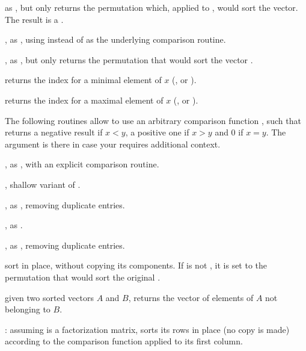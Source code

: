 
 as , but only returns the permutation
which, applied to , would sort the vector. The result is a
.

, as , using 
instead of  as the underlying comparison routine.

, as , but only
returns the permutation that would sort the vector .

 returns the index for a minimal element of $x$
(,  or ).

 returns the index for a maximal element of $x$
(,  or ).

 The following routines allow to use an
arbitrary comparison function ,
such that  returns a negative result if $x
< y$, a positive one if $x > y$ and 0 if $x = y$. The  argument is
there in case your  requires additional context.

, as
, with an explicit comparison routine.

,
shallow variant of .

, as
, removing duplicate entries.

,
as .

,
as , removing duplicate entries.

 sort  in place, without copying its components. If
 is not , it is set to the permutation that would sort
the original .

 given two sorted
vectors $A$ and $B$, returns the vector of elements of $A$ not belonging to
$B$.

:
assuming  is a factorization matrix, sorts its rows in place (no copy
is made) according to the comparison function  applied to its first
column.

